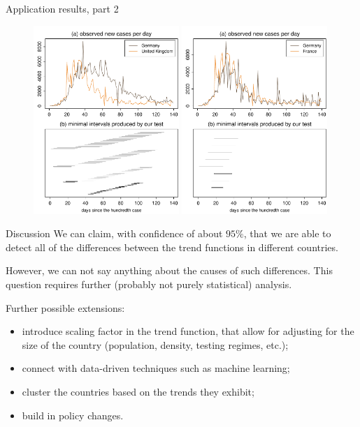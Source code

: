 \documentclass[10pt]{beamer}
\begin{document}
\begin{frame}{Application results, part 2}
	\begin{figure}
		\includegraphics[width=0.49\textwidth]{plots/DEU_vs_GBR_presentation}
		\hfill
		\includegraphics[width=0.49\textwidth]{plots/DEU_vs_FRA_presentation}
	\end{figure}
\end{frame}


\begin{frame}{Discussion}
We can claim, with confidence of about $95\%$, that we are able to detect all of the differences between the trend functions in different countries.\pause

However, we can not say anything about the causes of such differences. This question requires further (probably not purely statistical) analysis.\pause

Further possible extensions:
\vspace{-2mm}
\begin{itemize}
	\item introduce scaling factor in the trend function, that allow for adjusting for the size of the country (population, density, testing regimes, etc.);\pause
	\item connect with data-driven techniques such as machine learning;\pause
	\item cluster the countries based on the trends they exhibit; \pause
	\item build in policy changes.
\end{itemize}
\end{frame}
\end{document}

